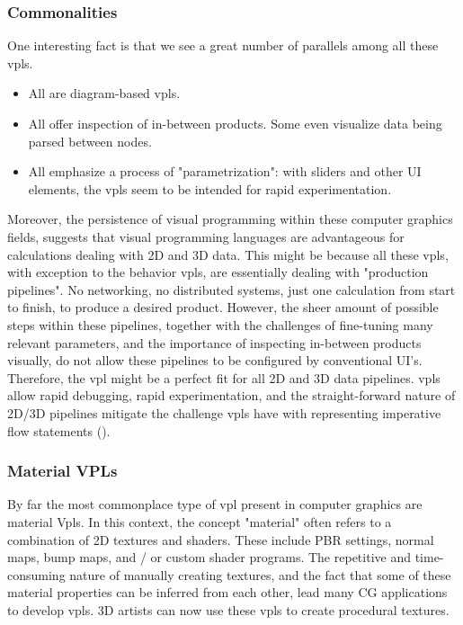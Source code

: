 \subsubsection*{Commonalities}
One interesting fact is that we see a great number of parallels among all these \ac{vpl}s.
\begin{itemize}[-]
  \item All are diagram-based vpls.
  \item All offer inspection of in-between products. Some even visualize data being parsed between nodes.
  \item All emphasize a process of "parametrization": with sliders and other UI elements, the vpls seem to be intended for rapid experimentation.
\end{itemize}
Moreover, the persistence of visual programming within these computer graphics fields, suggests that visual programming languages are advantageous for calculations dealing with 2D and 3D data.
This might be because all these vpls, with exception to the behavior vpls, are essentially dealing with "production pipelines".
No networking, no distributed systems, just one calculation from start to finish, to produce a desired product.  
However, the sheer amount of possible steps within these pipelines, together with the challenges of fine-tuning many relevant parameters, and the importance of inspecting in-between products visually, do not allow these pipelines to be configured by conventional UI's. 
Therefore, the \ac{vpl} might be a perfect fit for all 2D and 3D data pipelines.
vpls allow rapid debugging, rapid experimentation, and the straight-forward nature of 2D/3D pipelines mitigate the challenge vpls have with representing imperative flow statements (). 

\subsubsection*{Material VPLs}
By far the most commonplace type of vpl present in computer graphics are material Vpls. 
In this context, the concept "material" often refers to a combination of 2D textures and shaders. 
These include PBR settings, normal maps, bump maps, and / or custom shader programs. 
The repetitive and time-consuming nature of manually creating textures, and the fact that some of these material properties can be inferred from each other, lead many CG applications to develop \ac{vpl}s. 
3D artists can now use these \ac{vpl}s to create procedural textures.

